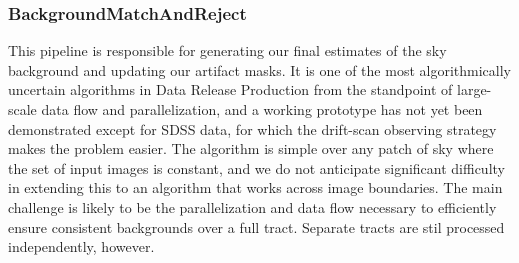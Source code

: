 \subsubsection{BackgroundMatchAndReject}
\label{sec:drpBackgroundMatchAndReject}

This pipeline is responsible for generating our final estimates of the sky background and updating our artifact masks.  It is one of the most algorithmically uncertain algorithms in Data Release Production from the standpoint of large-scale data flow and parallelization, and a working prototype has not yet been demonstrated except for SDSS data, for which the drift-scan observing strategy makes the problem easier.  The algorithm is simple over any patch of sky where the set of input images is constant, and we do not anticipate significant difficulty in extending this to an algorithm that works across image boundaries.  The main challenge is likely to be the parallelization and data flow necessary to efficiently ensure consistent backgrounds over a full tract.  Separate tracts are stil processed independently, however.

